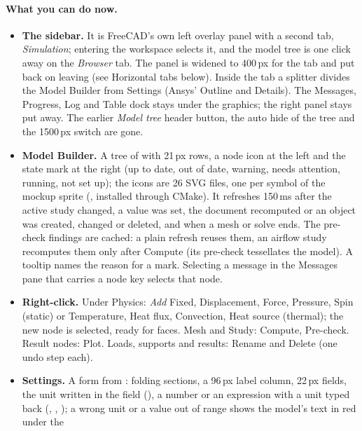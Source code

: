 \paragraph{What you can do now.}
\begin{itemize}[nosep]
  \item \textbf{The sidebar.} It is FreeCAD's own left overlay panel with a second tab, \emph{Simulation}; entering the
        workspace selects it, and the model tree is one click away on the \emph{Browser} tab. The panel is widened to
        400\,px for the tab and put back on leaving (see Horizontal tabs below). Inside the tab a splitter divides the Model Builder from Settings
        (Ansys' Outline and Details). The Messages, Progress, Log and Table dock stays under the graphics; the right panel
        stays put away. The earlier \emph{Model tree} header button, the auto hide of the tree and the 1500\,px switch
        are gone.
  \item \textbf{Model Builder.} A tree of  with 21\,px rows, a node icon at the left and the
        state mark at the right (up to date, out of date, warning, needs attention, running, not set up); the icons are
        26 SVG files, one per symbol of the mockup sprite (, installed through CMake). It refreshes
        150\,ms after the active study changed, a value was set, the document recomputed or an object was created, changed
        or deleted, and when a mesh or solve ends. The pre-check findings are cached: a plain refresh reuses them, an
        airflow study recomputes them only after Compute (its pre-check tessellates the model). A tooltip names the reason
        for a mark. Selecting a message in the Messages pane that carries a node key selects that node.
  \item \textbf{Right-click.} Under Physics: \emph{Add} Fixed, Displacement, Force, Pressure, Spin (static) or Temperature,
        Heat flux, Convection, Heat source (thermal); the new node is selected, ready for faces. Mesh and Study: Compute,
        Pre-check. Result nodes: Plot. Loads, supports and results: Rename and Delete (one undo step each).
  \item \textbf{Settings.} A form from : folding sections, a 96\,px label column, 22\,px fields,
        the unit written in the field (), a number or an expression with a unit typed back (,
        , ); a wrong unit or a value out of range shows the model's text in red under the

\end{itemize}
